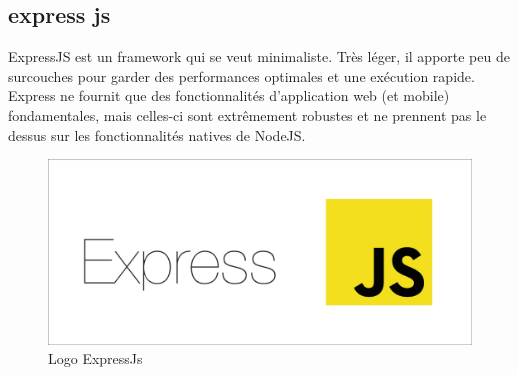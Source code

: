 \subsection{express js}
ExpressJS est un framework qui se veut minimaliste. Très léger, il apporte peu de surcouches pour garder des performances optimales et une exécution rapide. Express ne fournit que des fonctionnalités d’application web (et mobile) fondamentales, mais celles-ci sont extrêmement robustes et ne prennent pas le dessus sur les fonctionnalités natives de NodeJS. 
\begin{figure}[h]
	\centering
    \includegraphics[scale=0.1]{img/part3/4.4}
    \caption{Logo ExpressJs}
\end{figure}